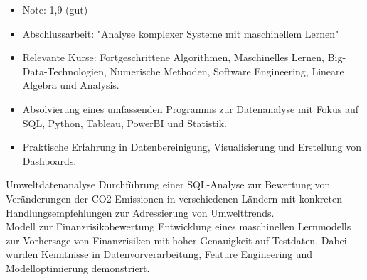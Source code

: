 \documentclass[9pt,a4paper,ragged2e,withhyper]{altacv}
\begin{document}
\begin{paracol}{2}
            \begin{itemize}
                \item Note: 1,9 (gut)
                \item Abschlussarbeit: "Analyse komplexer Systeme mit maschinellem Lernen"
                \item Relevante Kurse: Fortgeschrittene Algorithmen, Maschinelles Lernen, Big-Data-Technologien, Numerische Methoden, Software Engineering, Lineare Algebra und Analysis.
            \end{itemize}
            \vspace{0.5em}
            \begin{itemize}
                \item Absolvierung eines umfassenden Programms zur Datenanalyse mit Fokus auf SQL, Python, Tableau, PowerBI und Statistik.
                \item Praktische Erfahrung in Datenbereinigung, Visualisierung und Erstellung von Dashboards.
            \end{itemize}
            \vspace{0.5em}
        
        \cvevent
            { Umweltdatenanalyse }
            {  }
            {}
            {}
        Durchführung einer SQL-Analyse zur Bewertung von Veränderungen der CO2-Emissionen in verschiedenen Ländern mit konkreten Handlungsempfehlungen zur Adressierung von Umwelttrends.\\
        \vspace{0.5em}
        \cvevent
            { Modell zur Finanzrisikobewertung }
            {  }
            {}
            {}
        Entwicklung eines maschinellen Lernmodells zur Vorhersage von Finanzrisiken mit hoher Genauigkeit auf Testdaten. Dabei wurden Kenntnisse in Datenvorverarbeitung, Feature Engineering und Modelloptimierung demonstriert.\\
        \vspace{0.5em}

        
    \end{paracol}
\end{document}
